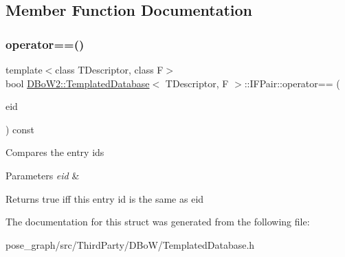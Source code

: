 \subsection{Member Function Documentation}
\mbox{\label{structDBoW2_1_1TemplatedDatabase_1_1IFPair_a2186464d16abcec0d8b84a8636f333bd}} 
\subsubsection{\texorpdfstring{operator==()}{operator==()}}
{\footnotesize\ttfamily template$<$class T\+Descriptor, class F$>$ \\
bool \hyperlink{classDBoW2_1_1TemplatedDatabase}{D\+Bo\+W2\+::\+Templated\+Database}$<$ T\+Descriptor, F $>$\+::I\+F\+Pair\+::operator== (\begin{DoxyParamCaption}\item[{\hyperlink{namespaceDBoW2_a060a36cf320e6e831ee98915c19c1623}{Entry\+Id}}]{eid }\end{DoxyParamCaption}) const\hspace{0.3cm}{\ttfamily [inline]}}

Compares the entry ids 
\begin{DoxyParams}{Parameters}
{\em eid} & \\
\hline
\end{DoxyParams}
\begin{DoxyReturn}{Returns}
true iff this entry id is the same as eid 
\end{DoxyReturn}


The documentation for this struct was generated from the following file\+:\begin{DoxyCompactItemize}
\item 
pose\+\_\+graph/src/\+Third\+Party/\+D\+Bo\+W/Templated\+Database.\+h\end{DoxyCompactItemize}
